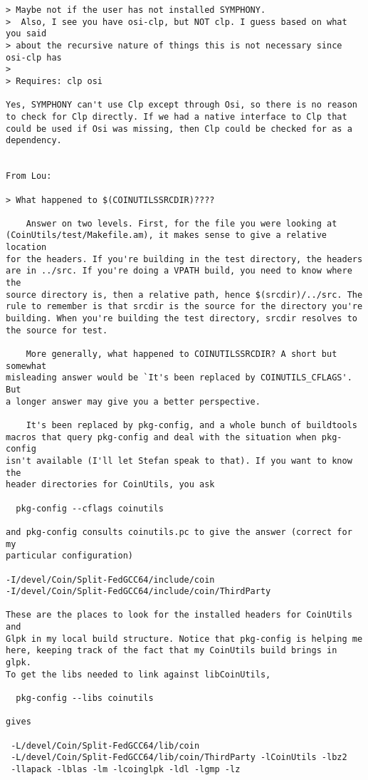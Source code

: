 \begin{verbatim}
> Maybe not if the user has not installed SYMPHONY.
>  Also, I see you have osi-clp, but NOT clp. I guess based on what you said
> about the recursive nature of things this is not necessary since osi-clp has
>
> Requires: clp osi

Yes, SYMPHONY can't use Clp except through Osi, so there is no reason
to check for Clp directly. If we had a native interface to Clp that
could be used if Osi was missing, then Clp could be checked for as a
dependency. 


From Lou:

> What happened to $(COINUTILSSRCDIR)????

	Answer on two levels. First, for the file you were looking at
(CoinUtils/test/Makefile.am), it makes sense to give a relative location
for the headers. If you're building in the test directory, the headers
are in ../src. If you're doing a VPATH build, you need to know where the
source directory is, then a relative path, hence $(srcdir)/../src. The
rule to remember is that srcdir is the source for the directory you're
building. When you're building the test directory, srcdir resolves to
the source for test.

	More generally, what happened to COINUTILSSRCDIR? A short but somewhat
misleading answer would be `It's been replaced by COINUTILS_CFLAGS'. But
a longer answer may give you a better perspective.

	It's been replaced by pkg-config, and a whole bunch of buildtools
macros that query pkg-config and deal with the situation when pkg-config
isn't available (I'll let Stefan speak to that). If you want to know the
header directories for CoinUtils, you ask

  pkg-config --cflags coinutils

and pkg-config consults coinutils.pc to give the answer (correct for my
particular configuration)

-I/devel/Coin/Split-FedGCC64/include/coin
-I/devel/Coin/Split-FedGCC64/include/coin/ThirdParty

These are the places to look for the installed headers for CoinUtils and
Glpk in my local build structure. Notice that pkg-config is helping me
here, keeping track of the fact that my CoinUtils build brings in glpk.
To get the libs needed to link against libCoinUtils,

  pkg-config --libs coinutils

gives

 -L/devel/Coin/Split-FedGCC64/lib/coin  
 -L/devel/Coin/Split-FedGCC64/lib/coin/ThirdParty -lCoinUtils -lbz2 
 -llapack -lblas -lm -lcoinglpk -ldl -lgmp -lz


\end{verbatim}

